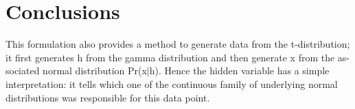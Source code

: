 \documentclass[10pt,twocolumn,letterpaper]{article}
\begin{document}
\section{Conclusions}
This formulation also provides a method to generate data from the t-distribution; it first generates h from the gamma distribution and then generate x from the as-sociated normal distribution Pr(x$|$h). Hence the hidden variable has a simple interpretation: it tells which one of the continuous family of underlying normal distributions was responsible for this data point.

{\small


}
\end{document}
